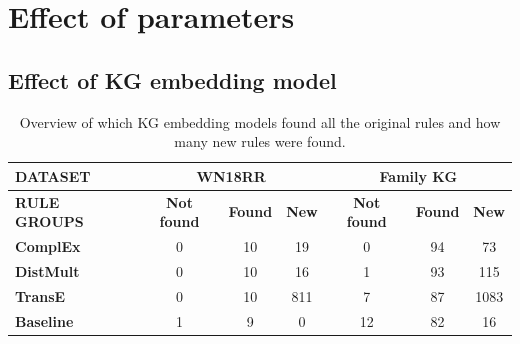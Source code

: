 \section{Effect of parameters}
\subsection{Effect of KG embedding model}

\begin{table}[h]
\begin{tabular}{|l|ccc||ccc|}
\hline
{\textbf{DATASET}}   & \multicolumn{3}{c||}{\textbf{WN18RR}}                                                                              & \multicolumn{3}{c|}{\textbf{Family KG}}                                                           \\ \hline
{\textbf{RULE GROUPS}}   & \multicolumn{1}{c|}{\textbf{Not found}} & \multicolumn{1}{c|}{\textbf{Found}} & \multicolumn{1}{c||}{\textbf{New}} & \multicolumn{1}{c|}{\textbf{Not found}} & \multicolumn{1}{c|}{\textbf{Found}} & \multicolumn{1}{c|}{\textbf{New}} \\ \hline
\textbf{ComplEx}  & \multicolumn{1}{c|}{0}                  & \multicolumn{1}{c|}{10}             & \multicolumn{1}{c||}{19}           & \multicolumn{1}{c|}{0}                  & \multicolumn{1}{c|}{94}             & \multicolumn{1}{c|}{73}           \\ \hline
\textbf{DistMult} & \multicolumn{1}{c|}{0}                     & \multicolumn{1}{c|}{10}                                  & 16                                & \multicolumn{1}{c|}{1}         & \multicolumn{1}{c|}{93}          & 115                               \\ \hline
\textbf{TransE}   & \multicolumn{1}{c|}{0}         & \multicolumn{1}{c|}{10}                     & 811                               & \multicolumn{1}{c|}{7}       & \multicolumn{1}{c|}{87}      & 1083                              \\ \hline
\textbf{Baseline} & \multicolumn{1}{c|}{1}     & \multicolumn{1}{c|}{9}                   & 0                                 & \multicolumn{1}{c|}{12}       & \multicolumn{1}{c|}{82}         & 16                                \\ \hline
\end{tabular}
\caption{Overview of which KG embedding models found all the original rules and how many new rules were found.}
\end{table}


